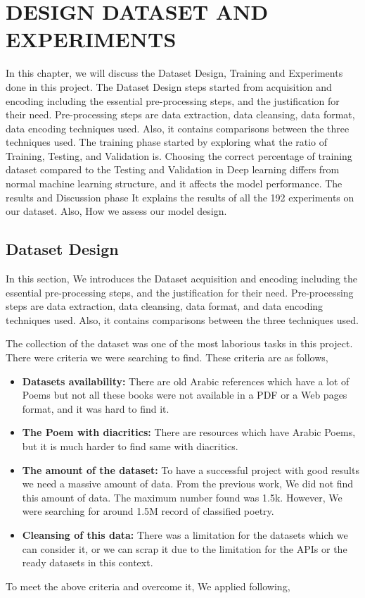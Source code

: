 \chapter{\uppercase{Design Dataset and Experiments}}\label{Ch:Model_Training}

In this chapter, we will discuss the Dataset Design, Training and Experiments done in this project. The Dataset Design steps started from acquisition and encoding including the essential pre-processing steps, and the justification for their need. Pre-processing steps are data extraction, data cleansing, data format, data encoding techniques used. Also, it contains comparisons between the three techniques used. The training phase started by exploring what the ratio of Training, Testing, and Validation is. Choosing the correct percentage of training dataset compared to the Testing and Validation in Deep learning differs from normal machine learning structure, and it affects the model performance. The results and Discussion phase It explains the results of all the 192 experiments on our dataset. Also, How we assess our model design.

\clearpage

\section{Dataset Design}

In this section, We introduces the Dataset acquisition and encoding including the essential pre-processing steps, and the justification for their need. Pre-processing steps are data extraction, data cleansing, data format, and data encoding techniques used. Also, it contains comparisons between the three techniques used.

The collection of the dataset was one of the most laborious tasks in this project. There were criteria we were searching to find. These criteria are as follows,
\begin{itemize}
  
  \item \textbf{Datasets availability:} There are old Arabic references which have a lot of Poems but not all these books were not available in a PDF or a Web pages format, and it was hard to find it.
  
  \item \textbf{The Poem with diacritics:} There are resources which have Arabic Poems, but it is much harder to find same with diacritics.
  
  \item \textbf{The amount of the dataset:} To have a successful project with good results we need a massive amount of data. From the previous work, We did not find this amount of data. The maximum number found was 1.5k. However, We were searching for around 1.5M record of classified poetry.

  
  \item \textbf{Cleansing of this data:} There was a limitation for the datasets which we can consider it, or we can scrap it due to the limitation for the APIs or the ready datasets in this context.
  
\end{itemize}
To meet the above criteria and overcome it, We applied following,

